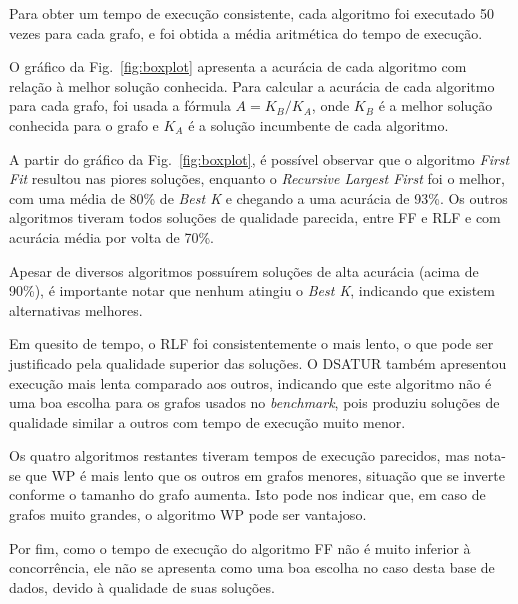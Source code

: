 \documentclass[10pt, twocolumn]{article}
\begin{document}
Para obter um tempo de execução consistente, cada algoritmo foi
executado 50 vezes para cada grafo, e foi obtida a média aritmética do tempo
de execução.

O gráfico da Fig.~\ref{fig:boxplot} apresenta a acurácia de cada algoritmo com
relação à melhor solução conhecida.
Para calcular a acurácia de cada algoritmo para cada grafo, foi usada a fórmula
$A=K_{B}/K_A$, onde $K_{B}$ é a melhor solução conhecida para o grafo e
$K_A$ é a solução incumbente de cada algoritmo.

A partir do gráfico da Fig.~\ref{fig:boxplot}, é possível observar que o algoritmo
\emph{First Fit} resultou nas piores soluções, enquanto o \emph{Recursive Largest First}
foi o melhor, com uma média de 80\% de \emph{Best K} e chegando a uma acurácia de 93\%.
Os outros algoritmos tiveram todos soluções de qualidade parecida, entre FF e RLF
e com acurácia média por volta de 70\%.

Apesar de diversos algoritmos possuírem soluções de alta acurácia (acima de 90\%),
é importante notar que nenhum atingiu o \emph{Best K}, indicando que existem
alternativas melhores.

Em quesito de tempo, o RLF foi consistentemente o mais lento, o que pode ser
justificado pela qualidade superior das soluções.
O DSATUR também apresentou execução mais lenta comparado aos outros, indicando
que este algoritmo não é uma boa escolha para os grafos usados no \emph{benchmark},
pois produziu soluções de qualidade similar a outros com tempo de execução muito menor.

Os quatro algoritmos restantes tiveram tempos de execução parecidos, mas nota-se
que WP é mais lento que os outros em grafos menores, situação que se inverte
conforme o tamanho do grafo aumenta.
Isto pode nos indicar que, em caso de grafos muito grandes, o algoritmo WP pode
ser vantajoso.

Por fim, como o tempo de execução do algoritmo FF não é muito inferior à
concorrência, ele não se apresenta como uma boa escolha no caso desta base de dados,
devido à qualidade de suas soluções.

  
\end{document}
